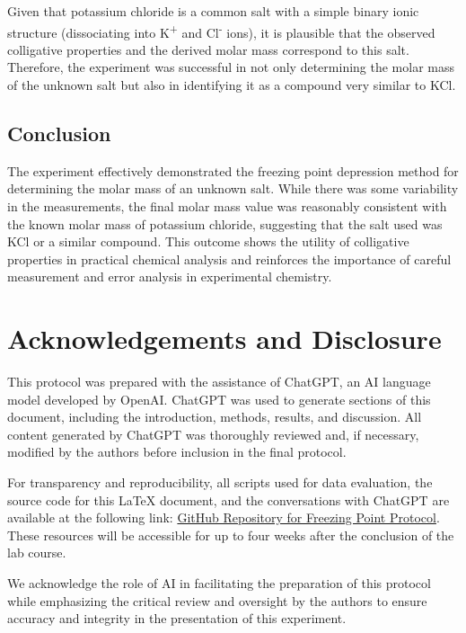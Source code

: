 \documentclass[a4paper,12pt]{article}
\begin{document}
Given that potassium chloride is a common salt with a simple binary ionic structure (dissociating into K\textsuperscript{+} and Cl\textsuperscript{-} ions), it is plausible that the observed colligative properties and the derived molar mass correspond to this salt. Therefore, the experiment was successful in not only determining the molar mass of the unknown salt but also in identifying it as a compound very similar to KCl.

\subsection{Conclusion}
The experiment effectively demonstrated the freezing point depression method for determining the molar mass of an unknown salt. While there was some variability in the measurements, the final molar mass value was reasonably consistent with the known molar mass of potassium chloride, suggesting that the salt used was KCl or a similar compound. This outcome shows the utility of colligative properties in practical chemical analysis and reinforces the importance of careful measurement and error analysis in experimental chemistry.

\section{Acknowledgements and Disclosure}
This protocol was prepared with the assistance of ChatGPT, an AI language model developed by OpenAI. ChatGPT was used to generate sections of this document, including the introduction, methods, results, and discussion. All content generated by ChatGPT was thoroughly reviewed and, if necessary, modified by the authors before inclusion in the final protocol.

For transparency and reproducibility, all scripts used for data evaluation, the source code for this LaTeX document, and the conversations with ChatGPT are available at the following link: \href{https://github.com/kilianmandon/pc_praktikum/tree/main/freezing_point}{GitHub Repository for Freezing Point Protocol}. These resources will be accessible for up to four weeks after the conclusion of the lab course.

We acknowledge the role of AI in facilitating the preparation of this protocol while emphasizing the critical review and oversight by the authors to ensure accuracy and integrity in the presentation of this experiment.
\end{document}
